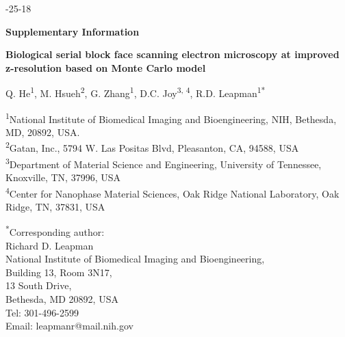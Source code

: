 \documentclass{article}
\begin{document}

-25-18

\begin{center}
\textbf{\large Supplementary Information}

\bigskip
\textbf{\large Biological serial block face scanning electron microscopy at improved z-resolution based on Monte Carlo model}
\end{center}

\noindent Q. He\textsuperscript{1}, M. Hsueh\textsuperscript{2}, G. Zhang\textsuperscript{1}, D.C. Joy\textsuperscript{3, 4}, R.D. Leapman\textsuperscript{1*}

\noindent\textsuperscript{1}National Institute of Biomedical Imaging and Bioengineering, NIH, Bethesda, MD, 20892, USA.\\
\textsuperscript{2}Gatan, Inc., 5794 W. Las Positas Blvd, Pleasanton, CA, 94588, USA\\
\textsuperscript{3}Department of Material Science and Engineering, University of Tennessee, Knoxville, TN, 37996, USA\\
\textsuperscript{4}Center for Nanophase Material Sciences, Oak Ridge National Laboratory, Oak Ridge, TN, 37831, USA

\bigskip
\noindent\textsuperscript{*}Corresponding author:\\
Richard D. Leapman\\
National Institute of Biomedical Imaging and Bioengineering,\\
Building 13, Room 3N17,\\
13 South Drive,\\
Bethesda, MD 20892, USA\\
Tel: 301-496-2599\\
Email: leapmanr@mail.nih.gov
\end{document}
